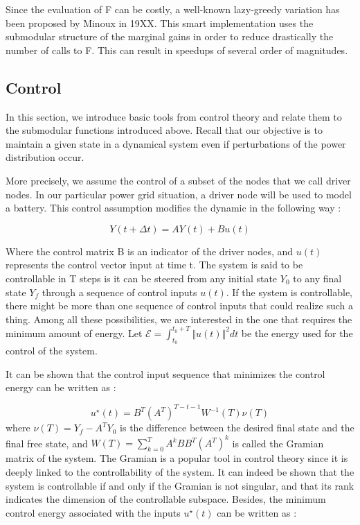 \documentclass[10pt,twoside%
                ,draft%
        ]{article}
\begin{document}
Since the evaluation of F can be costly, a well-known lazy-greedy variation has been proposed by Minoux in 19XX. This smart implementation uses the submodular structure of the marginal gains in order to reduce drastically the number of calls to F. This can result in speedups of several order of magnitudes.

\subsection{Control}

In this section, we introduce basic tools from control theory and relate them to the submodular functions introduced above. Recall that our objective is to maintain a given state in a dynamical system even if perturbations of the power distribution occur. 

More precisely, we assume the control of a subset of the nodes that we call driver nodes. In our particular power grid situation, a driver node will be used to model a battery. This control assumption modifies the dynamic in the following way :

\begin{equation}
 Y(t+\Delta t) = A Y(t) + B u(t) 
\end{equation}

Where the control matrix B is an indicator of the driver nodes, and $ u(t) $ represents the control vector input at time t. The system is said to be controllable in T steps is it can be steered from any initial state $ Y_0 $ to any final state $ Y_f $ through a sequence of control inputs $ u(t) $. If the system is controllable, there might be more than one sequence of control inputs that could realize such a thing. Among all these possibilities, we are interested in the one that requires the minimum amount of energy. Let $ \mathcal{E} = \int_{t_0}^{t_0+T} \Vert u(t) \Vert^2 dt $ be the energy used for the control of the system.

It can be shown that the control input sequence that minimizes the control energy can be written as :

\begin{equation}
 u^{\star}(t) = B^T(A^T)^{T-t-1}W^{-1}(T)\nu(T)
\end{equation}
where $ \nu(T) = Y_f - A^T Y_0 $ is the difference between the desired final state and the final free state, and $W(T) = \sum_{k=0}^{T} A^k B B^T (A^T)^k $ is called the Gramian matrix of the system. The Gramian is a popular tool in control theory since it is deeply linked to the controllability of the system. It can indeed be shown that the system is controllable if and only if the Gramian is not singular, and that its rank indicates the dimension of the controllable subspace. Besides, the minimum control energy associated with the inputs $ u^{\star}(t)$ can be written as :
\end{document}
